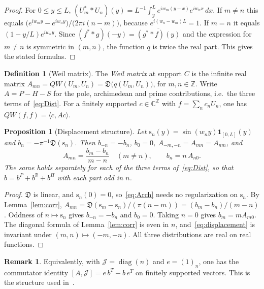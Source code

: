 \documentclass[11pt,a4paper]{article}
\newtheorem{proposition}[theorem]{Proposition}
\theoremstyle{definition}
\newtheorem{definition}[theorem]{Definition}
\newtheorem{remark}[theorem]{Remark}
\newcommand{\Z}{\mathbb{Z}}
\newcommand{\R}{\mathbb{R}}
\newcommand{\C}{\mathbb{C}}
\newcommand{\ip}[2]{\langle #1,#2\rangle}
\newcommand{\Dist}{\mathfrak{D}}
\newcommand{\sinw}{\mathrm{s}}
\DeclareMathOperator{\diag}{diag}
\begin{document}
\begin{proof}
For $0\le y\le L$, $(U_m^{*}*U_n)(y)=L^{-1}\int_y^Le^{iw_m(y-x)}e^{iw_nx}\,dx$.
If $m\ne n$ this equals
$\bigl(e^{iw_my}-e^{iw_ny}\bigr)/\bigl(2\pi i(n-m)\bigr)$, because
$e^{i(w_n-w_m)L}=1$. If $m=n$ it equals $(1-y/L)e^{iw_ny}$. Since
$(f^{*}*g)(-y)=\overline{(g^{*}*f)(y)}$ and the expression for $m\ne n$ is
symmetric in $(m,n)$, the function $q$ is twice the real part. This gives
the stated formulas.
\end{proof}

\begin{definition}[Weil matrix]\label{def:matrix}
The \emph{Weil matrix} at support $C$ is the infinite real matrix
$A_{mn}=QW(U_m,U_n)=\Dist\bigl(q(U_m,U_n)\bigr)$, for $m,n\in\Z$. Write
$A=P-H-S$ for the pole, archimedean and prime contributions, i.e.\ the three
terms of~\eqref{eq:Dist}. For a finitely supported $c\in\C^{\Z}$ with
$f=\sum_nc_nU_n$, one has $QW(f,f)=\ip{c}{Ac}$.
\end{definition}

\begin{proposition}[Displacement structure]\label{prop:displacement}
Let $\sinw_n(y)=\sin(w_ny)\mathbf 1_{[0,L]}(y)$ and $b_n=-\pi^{-1}\Dist(\sinw_n)$.
Then $b_{-n}=-b_n$, $b_0=0$, $A_{-m,-n}=A_{mn}=A_{nm}$, and
\begin{equation}\label{eq:displacement}
A_{mn}=\frac{b_m-b_n}{m-n}\quad(m\ne n),\qquad b_n=n\,A_{n0}.
\end{equation}
The same holds separately for each of the three terms of~\eqref{eq:Dist},
so that $b=b^P+b^\R+b^\Pi$ with each part odd in $n$.
\end{proposition}

\begin{proof}
$\Dist$ is linear, and $\sinw_n(0)=0$, so~\eqref{eq:Arch} needs no
regularization on $\sinw_n$. By Lemma~\ref{lem:corr},
$A_{mn}=\Dist(\sinw_m-\sinw_n)/(\pi(n-m))=(b_m-b_n)/(m-n)$. Oddness of
$n\mapsto\sinw_n$ gives $b_{-n}=-b_n$ and $b_0=0$. Taking $n=0$ gives
$b_m=mA_{m0}$. The diagonal formula of Lemma~\ref{lem:corr} is even in $n$,
and~\eqref{eq:displacement} is invariant under $(m,n)\mapsto(-m,-n)$. All
three distributions are real on real functions.
\end{proof}

\begin{remark}
Equivalently, with $\mathcal J=\diag(n)$ and $e=(1)_{n}$, one has the commutator
identity $[A,\mathcal J]=e\,b^{T}-b\,e^{T}$ on finitely supported vectors. This is the
structure used in~\cite[Lemma~5.2]{CCM2025}.
\end{remark}
\end{document}
